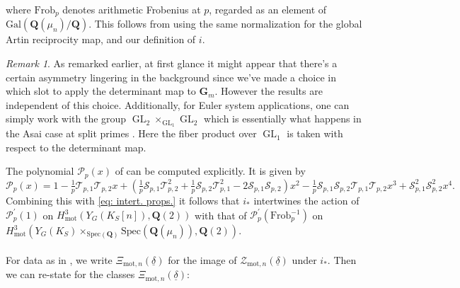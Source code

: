 \documentclass{amsart}%
\theoremstyle{plain}
\theoremstyle{plain}
\theoremstyle{remark}
\newtheorem{rem}[thm]{Remark}
\DeclareMathOperator{\GL}{GL}
\begin{document}
where $\mathrm{Frob}_p$ denotes arithmetic Frobenius at $p$, regarded as an element of $\mathrm{Gal}(\mathbf{Q}(\mu_n)/\mathbf{Q})$. This follows from \cite[\S $8.2$]{Loeffler_2021} using the same normalization for the global Artin reciprocity map, and our definition of $i$.
\begin{rem}
    As remarked earlier, at first glance it might appear that there's a certain asymmetry lingering in the background since we've made a choice in which slot to apply the determinant map to $\mathbf{G}_m$. However the results are independent of this choice. Additionally, for Euler system applications, one can simply work with the group $\GL_2\times_{\GL_1} \GL_2$ which is essentially what happens in the Asai case at split primes \cite[\S $5$]{Groutides+2026+103+124}. Here the fiber product over $\GL_1$ is taken with respect to the determinant map.
\end{rem}
\noindent The polynomial $\mathcal{P}_p(x)$ of  can be computed explicitly. It is given by
$$\mathcal{P}_p(x)=1-\tfrac{1}{p}\mathcal{T}_{p,1}\mathcal{T}_{p,2}x+\left(\tfrac{1}{p}\mathcal{S}_{p,1}\mathcal{T}_{p,2}^2+\tfrac{1}{p}\mathcal{S}_{p,2}\mathcal{T}_{p,1}^2-2\mathcal{S}_{p,1}\mathcal{S}_{p,2}\right)x^2-\tfrac{1}{p}\mathcal{S}_{p,1}\mathcal{S}_{p,2}\mathcal{T}_{p,1}\mathcal{T}_{p,2}x^3+\mathcal{S}_{p,1}^2\mathcal{S}_{p,2}^2x^4.$$
Combining this with \eqref{eq: intert. props.} it follows that $i_*$ intertwines the action of $\mathcal{P}_p^{'}(1)$ on $H_{\mathrm{mot}}^3\left(Y_G(K_S[n]),\mathbf{Q}(2)\right)$ with that of $\mathcal{P}_p^{'}\left(\mathrm{Frob}_p^{-1}\right)$ on $H_\mathrm{mot}^3\left(Y_G(K_S)\times_{\mathrm{Spec}(\mathbf{Q})}\mathrm{Spec}(\mathbf{Q}(\mu_n)),\mathbf{Q}(2)\right)$. \\
\\
For data as in , we write $\Xi_{\mathrm{mot},n}(\underline{\delta})$ for the image of $\mathcal{Z}_{\mathrm{mot},n}(\underline{\delta})$ under $i_*$. Then we can re-state  for the classes $\Xi_{\mathrm{mot},n}(\underline{\delta})$:
\end{document}
